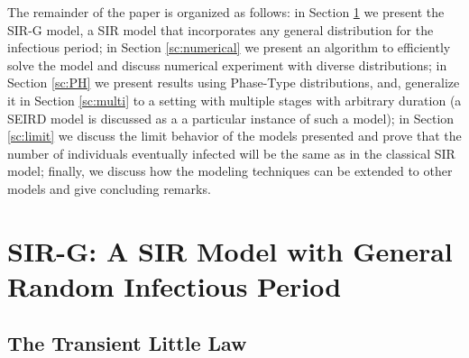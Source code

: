 \documentclass[USenglish,10pt]{article}
\begin{document}

The remainder of the paper is organized as follows: in Section \ref{sc:model} we present the SIR-G model, a SIR model that incorporates any general distribution for the infectious period; in Section \ref{sc:numerical} we present an algorithm to efficiently solve the model and discuss numerical experiment with diverse distributions; in Section \ref{sc:PH} we present results using Phase-Type distributions, and, generalize it in Section \ref{sc:multi} to a setting with multiple stages with arbitrary duration (a SEIRD model is discussed as a a particular instance of such a model); in Section \ref{sc:limit} we discuss the limit behavior of the models presented and prove that the number of individuals eventually infected will be the same as in the classical SIR model; finally, we discuss how the modeling techniques can be extended to other models and give concluding remarks.




\section{SIR-G: A SIR Model with General Random Infectious Period}\label{sc:model}



\subsection{The Transient Little Law}
\end{document}
